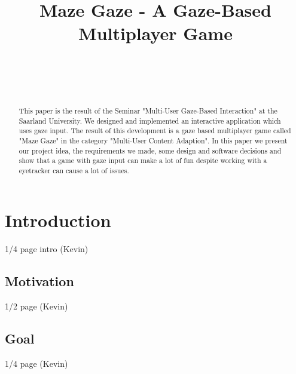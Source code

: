 \documentclass{sigchi}
\def\plaintitle{Maze Gaze - A Gaze-Based Multiplayer Game}
\def\plainkeywords{eye-tracking; gaze-based interaction; multi-user interaction; human computer interaction;}
\begin{document}
\title{\plaintitle}

\author{%
  \\
  \\
  \\
}

\maketitle

\begin{abstract}
This paper is the result of the Seminar "Multi-User Gaze-Based Interaction" at the Saarland University. We designed and implemented an interactive application which uses gaze input. The result of this development is a gaze based multiplayer game called "Maze Gaze" in the category "Multi-User Content Adaption". In this paper we present our project idea, the requirements we made, some design and software decisions and show that a game with gaze input can make a lot of fun despite working with a eyetracker can cause a lot of issues.
\end{abstract}


\section{Introduction}
1/4 page intro (Kevin)
\subsection{Motivation}
1/2 page (Kevin)
\subsection{Goal}
1/4 page (Kevin)
\end{document}
